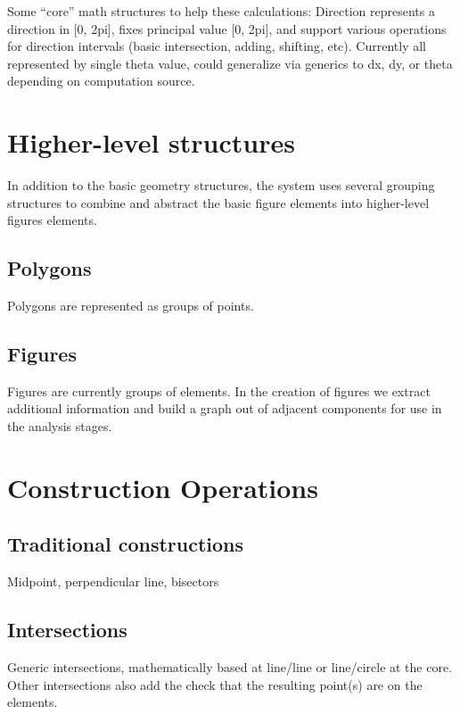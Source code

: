 Some ``core'' math structures to help these calculations: Direction
represents a direction in [0, 2pi], fixes principal value [0, 2pi],
and support various operations for direction intervals (basic
intersection, adding, shifting, etc). Currently all represented by
single theta value, could generalize via generics to dx, dy, or theta
depending on computation source.

\section{Higher-level structures}

In addition to the basic geometry structures, the system uses several
grouping structures to combine and abstract the basic figure elements
into higher-level figures elements.

\subsection{Polygons}

Polygons are represented as groups of points.

\subsection{Figures}

Figures are currently groups of elements. In the creation of figures
we extract additional information and build a graph out of adjacent
components for use in the analysis stages.

\section{Construction Operations}

\subsection{Traditional constructions}

Midpoint, perpendicular line, bisectors

\subsection{Intersections}

Generic intersections, mathematically based at line/line or
line/circle at the core. Other intersections also add the check that
the resulting point(s) are on the elements.

